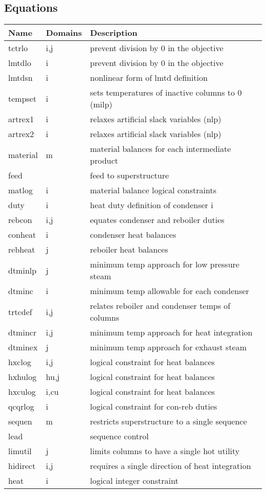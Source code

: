 \documentclass[11pt]{article}
\begin{document}
\subsection*{Equations}
\begin{tabularx}{\textwidth}{| l | l | X |}
\hline
\textbf{Name} & \textbf{Domains} & \textbf{Description}\\
\hline
\endhead

tctrlo & i,j & prevent division by 0 in the objective\\
lmtdlo & i & prevent division by 0 in the objective\\
lmtdsn & i & nonlinear form of lmtd definition\\
tempset & i & sets temperatures of inactive columns to 0 (milp)\\
artrex1 & i & relaxes artificial slack variables (nlp)\\
artrex2 & i & relaxes artificial slack variables (nlp)\\
material & m & material balances for each intermediate product\\
feed &  & feed to superstructure\\
matlog & i & material balance logical constraints\\
duty & i & heat duty definition of condenser i\\
rebcon & i,j & equates condenser and reboiler duties\\
conheat & i & condenser heat balances\\
rebheat & j & reboiler heat balances\\
dtminlp & j & minimum temp approach for low pressure steam\\
dtminc & i & minimum temp allowable for each condenser\\
trtcdef & i,j & relates reboiler and condenser temps of columns\\
dtmincr & i,j & minimum temp approach for heat integration\\
dtminex & j & minimum temp approach for exhaust steam\\
hxclog & i,j & logical constraint for heat balances\\
hxhulog & hu,j & logical constraint for heat balances\\
hxculog & i,cu & logical constraint for heat balances\\
qcqrlog & i & logical constraint for con-reb duties\\
sequen & m & restricts superstructure to a single sequence\\
lead &  & sequence control\\
limutil & j & limits columns to have a single hot utility\\
hidirect & i,j & requires a single direction of heat integration\\
heat & i & logical integer constraint\\
\hline
\end{tabularx}
\end{document}
